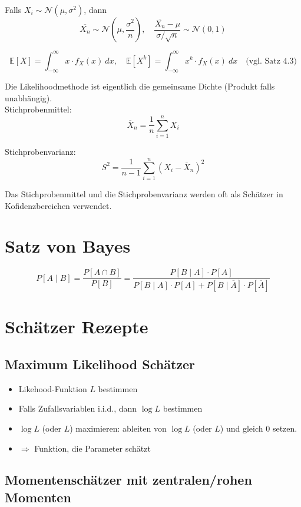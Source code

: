 Falls $X_i \sim \mathcal{N}(\mu, \sigma^2)$, dann $$\overline{X_n} \sim \mathcal{N}(\mu, \frac{\sigma^2}{n}),\quad\frac{\overline{X_n}-\mu}{\sigma / \sqrt{n}} \sim \mathcal{N}(0, 1)$$

$$
	\mathbb{E}[X] = \int_{-\infty}^\infty x \cdot f_X(x)\ dx,\quad
	\mathbb{E}[X^k] = \int_{-\infty}^\infty x^k \cdot f_X(x)\ dx\quad
	\text{(vgl. Satz 4.3)}
$$

Die Likelihoodmethode ist eigentlich die gemeinsame Dichte (Produkt falls unabhängig).\\

Stichprobenmittel: $$\overline{X}_n = \frac{1}{n	}\sum_{i=1}^nX_i$$

Stichprobenvarianz: $$S^2 = \frac{1}{n-1}\sum^n_{i=1}\left(X_i-\overline{X}_n\right)^2$$

Das Stichprobenmittel und die Stichprobenvarianz werden oft als Schätzer in Kofidenzbereichen verwendet.\\

\section{Satz von Bayes}

\[
	P[A\mid B] =
	\frac{P[A \cap B]}{P[B]} =
	\frac{P[B\mid A]\cdot P[A]}{P[B\mid A]\cdot P[A] + P[B \mid \overline{A}]\cdot P[\overline{A}]}
\]



\section{Schätzer Rezepte}

\subsection{Maximum Likelihood Schätzer}

\begin{itemize}
	\item Likehood-Funktion $L$ bestimmen
	\item Falls Zufallsvariablen i.i.d., dann $\log L$ bestimmen
	\item $\log L$ (oder $L$) maximieren: ableiten von $\log L$ (oder $L$) und gleich $0$ setzen.
	\item $\Rightarrow$ Funktion, die Parameter schätzt
\end{itemize}

\subsection{Momentenschätzer mit zentralen/rohen Momenten}

